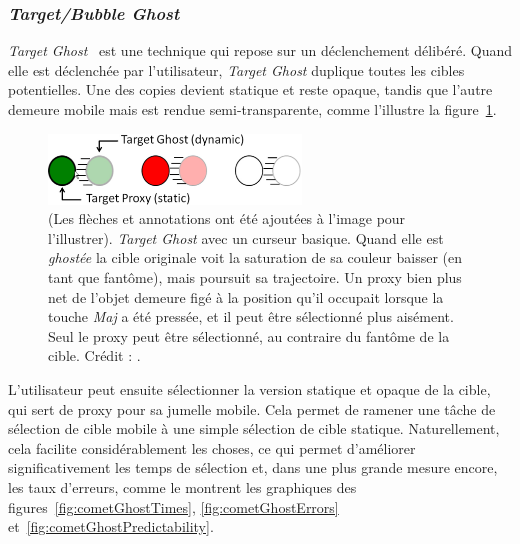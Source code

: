 	\subsubsection{\emph{Target/Bubble Ghost}}
	\emph{Target Ghost}~\cite{hasan2011comet} est une technique qui repose sur un déclenchement délibéré. Quand elle est déclenchée par l'utilisateur, \emph{Target Ghost} duplique toutes les cibles potentielles. Une des copies devient statique et reste opaque, tandis que l'autre demeure mobile mais est rendue semi-transparente, comme l'illustre la figure~\ref{fig:targetGhost}.
	
	\begin{figure}[!htb]
		\centering
		\includegraphics[width=0.6\textwidth]{figures/ch2/targetGhost}
		\caption[La technique \emph{Target Ghost}]{(Les flèches et annotations ont été ajoutées à l'image pour l'illustrer). \emph{Target Ghost} avec un curseur basique. Quand elle est \og \emph{ghostée} \fg{} la cible originale voit la saturation de sa couleur baisser (en tant que fantôme), mais poursuit sa trajectoire. Un proxy bien plus net de l'objet demeure figé à la position qu'il occupait lorsque la touche \emph{Maj} a été pressée, et il peut être sélectionné plus aisément. Seul le proxy peut être sélectionné, au contraire du fantôme de la cible. Crédit : \cite{hasan2011comet}.}
		\label{fig:targetGhost}
	\end{figure}
	
	L'utilisateur peut ensuite sélectionner la version statique et opaque de la cible, qui sert de proxy pour sa jumelle mobile. Cela permet de ramener une tâche de sélection de cible mobile à une simple sélection de cible statique. Naturellement, cela facilite considérablement les choses, ce qui permet d'améliorer significativement les temps de sélection et, dans une plus grande mesure encore, les taux d'erreurs, comme le montrent les graphiques des figures~\ref{fig:cometGhostTimes}, \ref{fig:cometGhostErrors} et~\ref{fig:cometGhostPredictability}.

